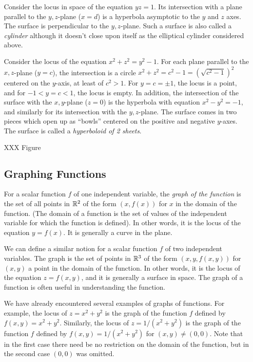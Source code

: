 \begin{example}
	Consider the locus in space of the equation $yz = 1$.   Its intersection
	with a plane parallel to the $y,z$-plane ($x = d$) is a hyperbola
	asymptotic to the $y$ and $z$ axes.  The surface is perpendicular
	to the $y,z$-plane.  Such a surface is also called a \emph{cylinder}
	although it doesn't close upon itself as the elliptical cylinder considered
	above.
\end{example}

\begin{example}
	Consider the locus of the equation $x^2 + z^2 = y^2 - 1$.  For
	each plane parallel to the $x,z$-plane ($y = c$), the intersection
	is a circle $x^2 + z^2 = c^2 - 1 = (\sqrt{c^2 - 1})^2$ centered
	on the $y$-axis, at least of $c^2 > 1$.  For $y = c = \pm 1$,
	the locus is a point, and for $-1 < y = c < 1$, the locus is
	empty.   In addition, the intersection of the surface with the
	$x,y$-plane ($z = 0$) is the hyperbola with equation $x^2 - y^2
	 = -1$, and similarly for its intersection with the $y,z$-plane.
	The surface comes in two pieces which open up as ``bowls'' centered
	on the positive and negative $y$-axes.   The surface is called
	a \emph{hyperboloid of 2 sheets}.    

	XXX Figure
\end{example}

\subsection{Graphing Functions}
For a scalar function $f$ of one independent variable, 
the \emph{graph of the function} is the set of
all points in $\mathbb{R}^2$  of the form  $(x, f(x))$
for $x$ in the domain of the function.   (The domain of a function
is the set of values of the independent variable for which the
function is defined).  In other words, it is the locus of the
equation $y = f(x)$.  It is generally a curve in the plane.

We can define a similar notion for a scalar function $f$ of two
independent variables.  The graph is the
set of points in $\mathbb{R}^3$  of the form $(x, y, f(x,y))$
for $(x,y)$ a point in the domain of the function.  In other words,
it is the locus of the equation $z = f(x,y)$, and it is generally
a surface in space.
The graph of a function is often useful in understanding the
function.

We have already encountered several examples of graphs of functions.
For example, the locus of $z = x^2 + y^2$ is the graph of the
function $f$ defined by $f(x,y) = x^2 +y^2$.   Similarly, the locus
of $z = 1/(x^2 + y^2)$ is the graph of the function $f$ defined by
$f(x,y) = 1/(x^2 + y^2)$ for $(x,y) \not= (0,0)$. 
  Note that in the first case there need
be no restriction on the domain of the function, but in the second
case $(0,0)$ was omitted.  

